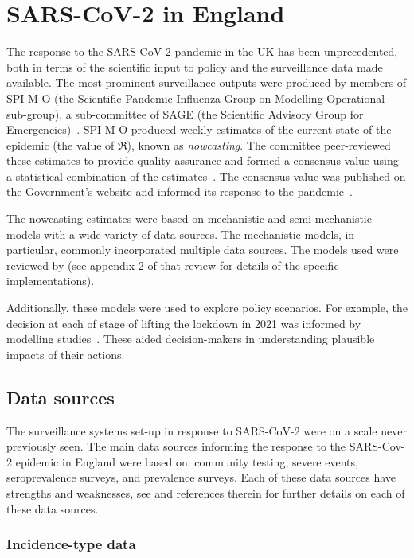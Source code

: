 \documentclass[thesis.tex]{subfiles}
\begin{document}
\section{SARS-CoV-2 in England}

The response to the SARS-CoV-2 pandemic in the UK has been unprecedented, both in terms of the scientific input to policy and the surveillance data made available.
The most prominent surveillance outputs were produced by members of SPI-M-O (the Scientific Pandemic Influenza Group on Modelling Operational sub-group), a sub-committee of SAGE (the Scientific Advisory Group for Emergencies)~\autocite{medleySPIM,govSPIMO}.
SPI-M-O produced weekly estimates of the current state of the epidemic (\eg the value of $\Re$), known as \emph{nowcasting}.
The committee peer-reviewed these estimates to provide quality assurance and formed a consensus value using a statistical combination of the estimates~\autocite{parkCombining}.
The consensus value was published on the Government's website and informed its response to the pandemic~\autocite{govRnumber}.

The nowcasting estimates were based on mechanistic and semi-mechanistic models with a wide variety of data sources.
The mechanistic models, in  particular, commonly incorporated multiple data sources.
The models used were reviewed by \textcite{royalSocietyRnumber} (see appendix 2 of that review for details of the specific implementations).

Additionally, these models were used to explore policy scenarios.
For example, the decision at each of stage of lifting the lockdown in 2021 was informed by modelling studies~\autocite{sageEvidence}.
These aided decision-makers in understanding plausible impacts of their actions.

\subsection{Data sources} \label{intro:sec:data-for-estimating}

The surveillance systems set-up in response to SARS-CoV-2 were on a scale never previously seen.
The main data sources informing the response to the SARS-Cov-2 epidemic in England were based on: community testing, severe events, seroprevalence surveys, and prevalence surveys.
Each of these data sources have strengths and weaknesses, see \textcite{royalSocietyRnumber} and references therein for further details on each of these data sources.

\subsubsection{Incidence-type data}
\end{document}
